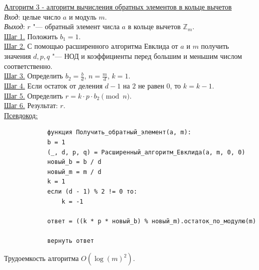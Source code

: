 \documentclass[bachelor, och, labwork]{shiza}
\begin{document}
        \underline{Алгоритм 3 - алгоритм вычисления обратных элементов в кольце вычетов}\\
            \textit{Вход}: целые число $a$ и модуль $m$.\\
            \textit{Выход}: $r$ "--- обратный элемент числа $a$ в кольце вычетов $\mathbb{Z}_m$.\\
            \underline{Шаг 1.} Положить $b_1 = 1$.\\ 
            \underline{Шаг 2.} С помощью расширенного алгоритма Евклида от $a$ и
            $m$ получить значения $d, p, q$ "--- НОД и коэффициенты перед
            большим и меньшим числом соответственно.\\
            \underline{Шаг 3.} Определить $b_2 = \frac{b}{d}$, $n = \frac{m}{d}$, $k = 1$.\\
            \underline{Шаг 4.} Если остаток от деления $d - 1$ на $2$ не равен
            $0$, то $k = k - 1$.\\
            \underline{Шаг 5.} Определить $r = k \cdot p \cdot b_2 \pmod n$.\\
            \underline{Шаг 6.} Результат: $r$.\\

        \underline{Псевдокод:}
            \begin{verbatim}
            функция Получить_обратный_элемент(a, m):
            b = 1
            (_, d, p, q) = Расширенный_алгоритм_Евклида(a, m, 0, 0)
            новый_b = b / d
            новый_m = m / d
            k = 1
            если (d - 1) % 2 != 0 то:
                k = -1
            
            ответ = ((k * p * новый_b) % новый_m).остаток_по_модулю(m)
        
            вернуть ответ
            \end{verbatim}

            Трудоемкость алгоритма $O(\log(m)^2)$.\\
\end{document}
